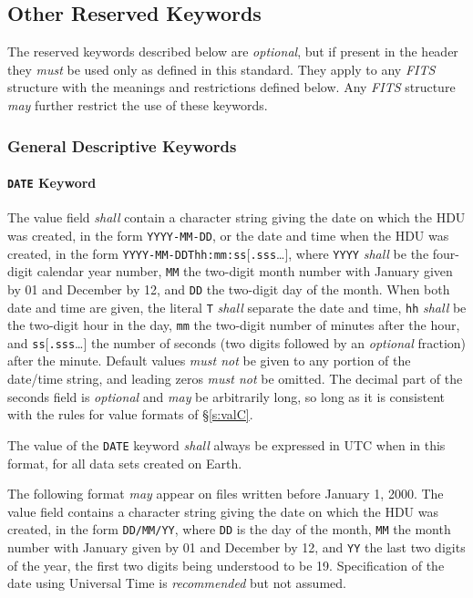 \documentclass[11pt,makeidx]{book}     %
\begin{document}
\subsection{Other Reserved Keywords}
 \label{s:resk}
   The reserved keywords described
   below are {\em optional}, but if present in the header they {\em must} be 
   used only as defined in this standard.
   They apply to any {\em FITS\/} 
   structure 
   with the meanings and restrictions defined below.  
   Any {\em FITS\/} structure {\em may} further restrict the use of 
   these keywords.
   
\subsubsection{General Descriptive Keywords}
 \label{s:dhist}
 \paragraph{{\tt DATE} Keyword}
 The value field {\em shall} contain a character 
 string giving 
 the date on which the HDU was created, 
 in the form {\tt YYYY-MM-DD}, or the date and time when the HDU was  
 created, in the form {\tt YYYY-MM-DDThh:mm:ss}[{\tt .sss}\ldots],
 where {\tt YYYY} {\em shall} be the four-digit calendar year number, 
 {\tt MM} the two-digit month number
 with January given by 01 and December by 12,
 and {\tt DD} the two-digit day of the month.  When both date and time 
 are given, the literal {\tt T} {\em shall} separate the date and time, 
 {\tt hh} {\em shall} be the two-digit hour in the day, 
 {\tt mm} the two-digit number of minutes after the 
 hour, and {\tt ss}[{\tt .sss}\ldots] the number of 
 seconds (two digits followed by an {\em optional} fraction) after the 
 minute. Default values {\em must not} be given to any portion of the date/time
 string, and leading zeros {\em must not} be omitted.
 The decimal part of the seconds field is {\em optional} and {\em may} be
 arbitrarily long, so long as it is consistent with the rules for 
 value formats of \S\ref{s:valC}.  

 The value of the {\tt DATE} keyword {\em shall} always 
 be expressed in UTC when in this format, for all data sets created on Earth.  
   
 The following format {\em may} appear on files written before 
 January 1, 2000.  The value field contains a character 
 string giving the date 
 on which the HDU was created, in the form {\tt DD/MM/YY}, 
 where {\tt DD} is the day of the month, 
 {\tt MM} the month number 
 with January given by 01 and December by 12, and {\tt YY} 
 the last two digits of the year, the first two digits being
 understood to be 19. Specification of the date 
 using Universal Time is 
 {\em recommended} but not assumed.  
\end{document}
